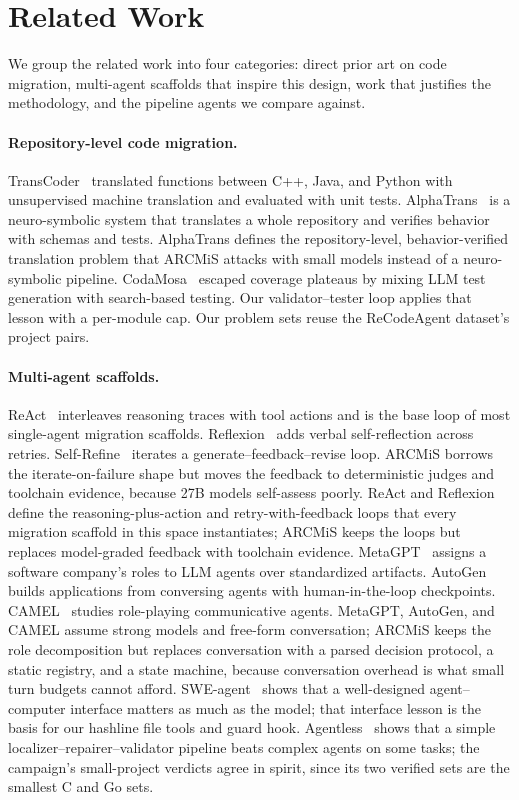 \documentclass[11pt]{article}
\begin{document}
\section{Related Work}
\label{sec:related}

We group the related work into four categories: direct prior art on code
migration, multi-agent scaffolds that inspire this design, work that
justifies the methodology, and the pipeline agents we compare against.

\paragraph{Repository-level code migration.}
TransCoder~\cite{lachaux2020transcoder} translated functions between
C++, Java, and Python with unsupervised machine translation and evaluated
with unit tests. AlphaTrans~\cite{ibrahimzada2024alphatrans} is a
neuro-symbolic system that translates a whole repository and verifies
behavior with schemas and tests. AlphaTrans defines the repository-level,
behavior-verified translation problem that ARCMiS attacks with small
models instead of a neuro-symbolic pipeline.
CodaMosa~\cite{lemieux2023codamosa} escaped coverage plateaus
by mixing LLM test generation with search-based testing. Our
validator--tester loop applies that lesson with a per-module cap. Our
problem sets reuse the ReCodeAgent dataset's project pairs.

\paragraph{Multi-agent scaffolds.}
ReAct~\cite{yao2023react} interleaves reasoning traces with tool actions
and is the base loop of most single-agent migration scaffolds.
Reflexion~\cite{shinn2023reflexion}
adds verbal self-reflection across retries. Self-Refine~\cite{madaan2023selfrefine}
iterates a generate--feedback--revise loop. ARCMiS borrows the
iterate-on-failure shape but moves the feedback to deterministic judges
and toolchain evidence, because 27B models self-assess poorly. ReAct and
Reflexion define the reasoning-plus-action and
retry-with-feedback loops that every migration scaffold in this space
instantiates; ARCMiS keeps the loops but replaces model-graded feedback
with toolchain evidence. MetaGPT~\cite{hong2024metagpt} assigns a software company's
roles to LLM agents over standardized artifacts. AutoGen~\cite{wu2023autogen}
builds applications from conversing agents with human-in-the-loop
checkpoints. CAMEL~\cite{li2023camel} studies role-playing communicative
agents. MetaGPT, AutoGen, and CAMEL assume strong models and free-form
conversation; ARCMiS keeps the role decomposition but replaces
conversation with a parsed decision protocol, a static registry, and a
state machine, because conversation overhead is what small turn budgets
cannot afford. SWE-agent~\cite{yang2024sweagent} shows that a
well-designed agent--computer interface matters as much as the model;
that interface lesson is the basis for our hashline file tools and guard
hook. Agentless~\cite{xia2025agentless}
shows that a simple localizer--repairer--validator pipeline beats complex
agents on some tasks; the campaign's small-project verdicts agree in
spirit, since its two verified sets are the smallest C and Go sets.
\end{document}
